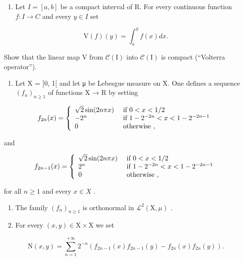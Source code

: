 \exercisesection{}

\begin{enumerate}
\def\labelenumi{\arabic{enumi})}
\tightlist
\item
  Let \(I = [a, b]\) be a compact interval of R. For every continuous function \(f: I \to C\) and every \(y \in I\) set
\end{enumerate}

\[
\mathrm{V} (f) (y) = \int_ {a} ^ {y} f (x) d x.
\]

Show that the linear map V from \(\mathcal{C}(\mathrm{I})\) into \(\mathcal{C}(\mathrm{I})\) is compact (“Volterra operator”).

\begin{enumerate}
\def\labelenumi{\arabic{enumi})}
\setcounter{enumi}{1}
\tightlist
\item
  Let X = {]}0, 1{[} and let μ be Lebesgue measure on X. One defines a sequence \((f_{n})_{n \geqslant 1}\) of functions X → R by setting
\end{enumerate}

\[
f _ {2 n} (x) = \left\{ \begin{array}{l l} \sqrt {2} \sin (2 n \pi x) & \text { if } 0 <   x <   1 / 2 \\ - 2 ^ {n} & \text { if } 1 - 2 ^ {- 2 n} <   x <   1 - 2 ^ {- 2 n - 1} \\ 0 & \text { otherwise }, \end{array} \right.
\]

and

\[
f _ {2 n - 1} (x) = \left\{ \begin{array}{l l} \sqrt {2} \sin (2 n \pi x) & \text { if } 0 <   x <   1 / 2 \\ 2 ^ {n} & \text { if } 1 - 2 ^ {- 2 n} <   x <   1 - 2 ^ {- 2 n - 1} \\ 0 & \text { otherwise }, \end{array} \right.
\]

for all \(n \geqslant 1\) and every \(x \in X\) .

\begin{enumerate}
\def\labelenumi{\alph{enumi})}
\item
  The family \((f_n)_{n\geqslant 1}\) is orthonormal in \(\mathcal{L}^2 (\mathrm{X},\mu)\) .
\item
  For every \((x,y)\in \mathrm{X}\times \mathrm{X}\) we set
\end{enumerate}

\[
\mathrm{N} (x, y) = \sum_ {n = 1} ^ {+ \infty} 2 ^ {- n} (f _ {2 n - 1} (x) f _ {2 n - 1} (y) - f _ {2 n} (x) f _ {2 n} (y)).
\]

